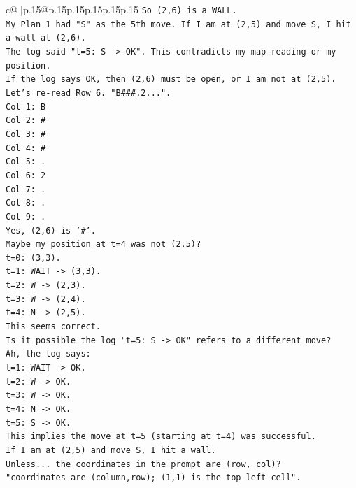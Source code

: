 \documentclass{article}
\begin{document}
{\begin{supertabular}{c@{$\;$}|p{.15\linewidth}@{}p{.15\linewidth}p{.15\linewidth}p{.15\linewidth}p{.15\linewidth}p{.15\linewidth}}
{{{\texttt{So (2,6) is a WALL.} \\
\texttt{My Plan 1 had "S" as the 5th move. If I am at (2,5) and move S, I hit a wall at (2,6).} \\
\texttt{The log said "t=5: S {-}> OK". This contradicts my map reading or my position.} \\
\texttt{If the log says OK, then (2,6) must be open, or I am not at (2,5).} \\
\texttt{Let's re{-}read Row 6. "B\#\#\#.2...".} \\
\texttt{Col 1: B} \\
\texttt{Col 2: \#} \\
\texttt{Col 3: \#} \\
\texttt{Col 4: \#} \\
\texttt{Col 5: .} \\
\texttt{Col 6: 2} \\
\texttt{Col 7: .} \\
\texttt{Col 8: .} \\
\texttt{Col 9: .} \\
\texttt{Yes, (2,6) is '\#'.} \\
\texttt{Maybe my position at t=4 was not (2,5)?} \\
\texttt{t=0: (3,3).} \\
\texttt{t=1: WAIT {-}> (3,3).} \\
\texttt{t=2: W {-}> (2,3).} \\
\texttt{t=3: W {-}> (2,4).} \\
\texttt{t=4: N {-}> (2,5).} \\
\texttt{This seems correct.} \\
\texttt{Is it possible the log "t=5: S {-}> OK" refers to a different move?} \\
\texttt{Ah, the log says:} \\
\texttt{t=1: WAIT {-}> OK.} \\
\texttt{t=2: W {-}> OK.} \\
\texttt{t=3: W {-}> OK.} \\
\texttt{t=4: N {-}> OK.} \\
\texttt{t=5: S {-}> OK.} \\
\texttt{This implies the move at t=5 (starting at t=4) was successful.} \\
\texttt{If I am at (2,5) and move S, I hit a wall.} \\
\texttt{Unless... the coordinates in the prompt are (row, col)?} \\
\texttt{"coordinates are (column,row); (1,1) is the top{-}left cell".} \\
}}}
\end{supertabular}}
\end{document}
